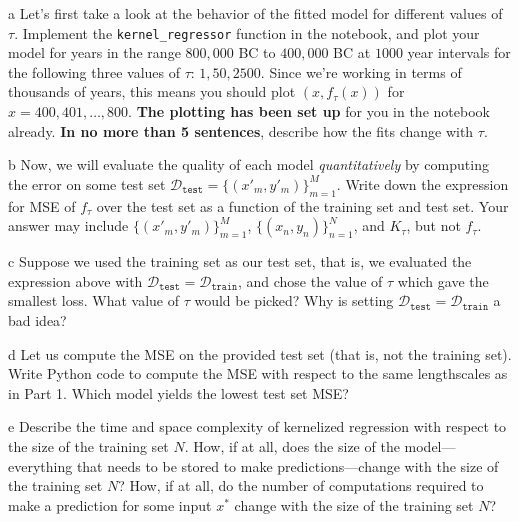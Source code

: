 \documentclass[expanded]{pset}
\begin{document}
\begin{parts}
  \begin{part}{a}
    Let's first take a look at the behavior of the fitted model for different values of $\tau$. Implement the \texttt{kernel\_regressor} function in the notebook, and plot your model for years in the range $800,000$ BC to $400,000$ BC at $1000$ year intervals for the following three values of $\tau$: $1, 50, 2500$. 
    Since we're working in terms of thousands of years, this means you should plot $(x, f_\tau(x))$ for $x = 400, 401, \dots, 800$. \textbf{The plotting has been set up} for you in the notebook already. \textbf{In no more than 5 sentences}, describe how the fits change with $\tau$.
  \end{part}

  \begin{part}{b} 
    Now, we will evaluate the quality of each model \emph{quantitatively} by computing the error on some test set $\mathcal{D}_\texttt{test} = \{(x'_m, y'_m)\}_{m = 1} ^M$.  Write down the expression for MSE of $f_\tau$ over the test set as a function of the training set and test set. Your answer may include $\{(x'_m, y'_m)\}_{m = 1} ^M$, $\{(x_n, y_n)\}_{n = 1} ^N$, and $K_\tau$, but not $f_\tau$.
  \end{part}

  \begin{part}{c}
    Suppose we used the training set as our test set, that is, we evaluated the expression above with $\mathcal{D}_\texttt{test} = \mathcal{D}_\texttt{train}$, and chose the value of $\tau$ which gave the smallest loss.  What value of $\tau$ would be picked?  Why is setting $\mathcal{D}_\texttt{test} = \mathcal{D}_\texttt{train}$ a bad idea?
  \end{part}


  \begin{part}{d}
    Let us compute the MSE on the provided test set (that is, not the training set). Write Python code to compute the MSE with respect to the same lengthscales as in Part 1. Which model yields the lowest test set MSE? 
  \end{part}

  \begin{part}{e}
    Describe the time and space complexity of kernelized regression with respect to the size of the training set $N$. 
    How, if at all, does the size of the model---everything that needs to be stored to make predictions---change with the size of the training set $N$? 
    How, if at all, do the number of computations required to make a prediction for some input $x^*$ change with the size of the training set $N$?
  \end{part}
\end{parts}
\end{document}
